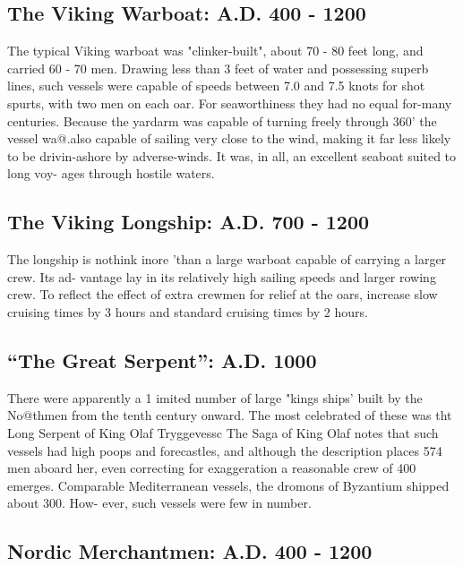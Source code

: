 \documentclass{article}
\begin{document}
\begin{multicols}{2}
\subsection{The Viking Warboat:  A.D. 400 - 1200}

The typical Viking warboat was "clinker-built", about 70 - 80 feet
long, and carried 60 - 70 men. Drawing less than 3 feet of water and
possessing superb lines, such vessels were capable of speeds between
7.0 and 7.5 knots for shot spurts, with two men on each oar.  For
seaworthiness they had no equal for-many centuries. Because the
yardarm was capable of turning freely through 360' the vessel wa@.also
capable of sailing very close to the wind, making it far less likely
to be drivin-ashore by adverse-winds. It was, in all, an excellent
seaboat suited to long voy- ages through hostile waters.

\subsection{The Viking Longship: A.D. 700 - 1200}

The longship is nothink inore 'than a large warboat capable of
carrying a larger crew.  Its ad- vantage lay in its relatively high
sailing speeds and larger rowing crew.  To reflect the effect of extra
crewmen for relief at the oars, increase slow cruising times by 3
hours and standard cruising times by 2 hours.

\subsection{``The Great Serpent'': A.D. 1000}

There were apparently a 1 imited number of large "kings ships' built
by the No@thmen from the tenth century onward. The most celebrated of
these was tht Long Serpent of King Olaf Tryggevessc The Saga of King
Olaf notes that such vessels had high poops and forecastles, and
although the description places 574 men aboard her, even correcting
for exaggeration a reasonable crew of 400 emerges. Comparable
Mediterranean vessels, the dromons of Byzantium shipped about 300.
How- ever, such vessels were few in number.

\subsection{Nordic Merchantmen:  A.D. 400 - 1200}


\end{multicols}
\end{document}

